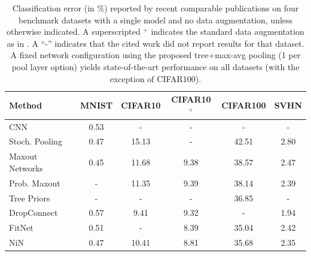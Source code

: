 \documentclass[twoside]{article}
\begin{document}
\begin{table}[t]
\footnotesize
\caption{\label{tab:all} Classification error (in \%) reported by recent comparable publications
on four benchmark datasets with a single model and no data augmentation, unless 
otherwise indicated. A superscripted $^{+}$ indicates the standard data augmentation
as in \cite{lin2013network,lee2015deeply,springenberg2015striving}.
A ``-'' indicates that the cited work did not report results for that dataset. 
A fixed network configuration using the proposed tree+max-avg pooling
(1 per pool layer option) yields state-of-the-art performance on all datasets (with the exception of CIFAR100).
}
\vspace{-3mm}
\begin{center}
\begin{tabular}{l| c | c | c | c | c}
\hline
Method                                                      & {\tiny MNIST} & {\tiny CIFAR10} & {\tiny CIFAR10$^{+}$}  & {\tiny CIFAR100} & {\tiny SVHN}          \\
\hline
{\tiny CNN   \cite{jarrett2009best}}                         & 0.53          & -               & -                      &  -              & -             \\
{\tiny Stoch. Pooling \cite{zeiler2013stochastic}}          & 0.47          & 15.13           & -                      & 42.51           & 2.80          \\
{\tiny Maxout Networks \cite{goodfellow2013maxout}}         & 0.45          & 11.68           & 9.38                   & 38.57           & 2.47          \\
{\tiny Prob. Maxout \cite{springenberg2014improving}}       & -             & 11.35           & 9.39                   & 38.14           & 2.39          \\
{\tiny Tree Priors \cite{srivastava2013discriminative}}     & -             & -               & -                      & 36.85           & -             \\
{\tiny DropConnect \cite{li2013regularization}}             & 0.57          &  9.41           & 9.32                   & -               & 1.94          \\
{\tiny FitNet \cite{romero2015fitnets}}                     & 0.51          & -               & 8.39                   & 35.04           & 2.42          \\
{\tiny NiN \cite{lin2013network}}                           & 0.47          & 10.41           & 8.81                   & 35.68           & 2.35          \\

\end{tabular}
\end{center}
\end{table}
\end{document}
